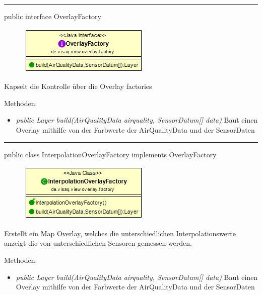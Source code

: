 
\rule{\textwidth}{0.4pt}
public interface OverlayFactory

\begin{minipage}{0.3\textwidth}
    \begin{figure}[H]
        \includegraphics[scale = 0.5
        ]{media/frontend/view/de.view.overlay.factory/OverlayFactory_Class.png}
    \end{figure}
    \end{minipage} \hfill
    \begin{minipage}{0.6\textwidth}
Kapselt die Kontrolle über die Overlay factories
\end{minipage}

Methoden:
\begin{itemize}
    \item \emph{public Layer build(AirQualityData airquality, SensorDatum[] data)}  Baut einen Overlay mithilfe von der Farbwerte der AirQualityData und der SensorDaten
\end{itemize}

\rule{\textwidth}{0.4pt}
public class InterpolationOverlayFactory implements OverlayFactory

\begin{minipage}{0.3\textwidth}
    \begin{figure}[H]
        \includegraphics[scale = 0.5]{media/frontend/view/de.view.overlay.factory/InterpolationOverlayFactory_Class.png}
    \end{figure}
    \end{minipage} \hfill
    \begin{minipage}{0.6\textwidth}
Erstellt ein Map Overlay, welches die unterschiedlichen Interpolationswerte anzeigt die von unterschiedlichen Sensoren gemessen werden.
\end{minipage}

Methoden:
\begin{itemize}
    \item \emph{public Layer build(AirQualityData airquality, SensorDatum[] data)}  Baut einen Overlay mithilfe von der Farbwerte der AirQualityData und der SensorDaten
\end{itemize}

